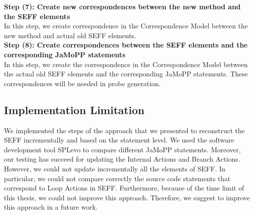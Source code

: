 \textbf{Step (7): Create new correspondences between the new method and the SEFF elements}\\
In this step, we create correspondence in the Correspondence Model between the new method and actual old SEFF elements.\\

\textbf{Step (8): Create correspondences between the SEFF elements and the corresponding JaMoPP statements}\\
In this step, we create the correspondence in the Correspondence Model between the actual old SEFF elements and the corresponding JaMoPP statements. These correspondences will be needed in probe generation.\\

\subsection{Implementation Limitation}
\label{sec:Implementation Limitation}

We implemented the steps of the approach that we presented to reconstruct the SEFF incrementally and based on the statement level. We used the software development tool SPLevo \cite{klatt2016consolidation} to compare different JaMoPP statements. Moreover, our testing has succeed for updating the Internal Actions and Branch Actions. However, we could not update incrementally all the elements of SEFF. In particular, we could not compare correctly the source code statements that correspond to Loop Actions in SEFF. Furthermore, because of the time limit of this thesis, we could not improve this approach. Therefore, we suggest to improve this approach in a future work.   



